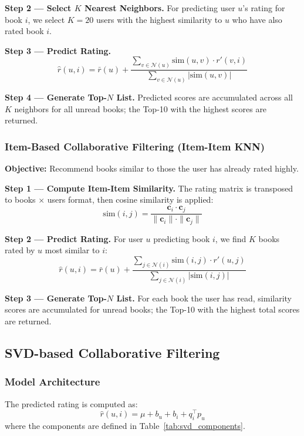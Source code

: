 \documentclass[12pt, a4paper]{article}
\begin{document}
\textbf{Step 2 --- Select $K$ Nearest Neighbors.}
For predicting user $u$'s rating for book $i$, we select $K = 20$ users
with the highest similarity to $u$ who have also rated book $i$.

\textbf{Step 3 --- Predict Rating.}
\[
  \hat{r}(u, i) = \bar{r}(u) + \frac{\sum_{v \in \mathcal{N}(u)} \text{sim}(u,v) \cdot r'(v,i)}
                                     {\sum_{v \in \mathcal{N}(u)} |\text{sim}(u,v)|}
\]

\textbf{Step 4 --- Generate Top-$N$ List.}
Predicted scores are accumulated across all $K$ neighbors for all unread books;
the Top-10 with the highest scores are returned.

\subsubsection{Item-Based Collaborative Filtering (Item-Item KNN)}

\textbf{Objective:} Recommend books similar to those the user has already rated highly.

\textbf{Step 1 --- Compute Item-Item Similarity.}
The rating matrix is transposed to books $\times$ users format, then cosine similarity is applied:
\[
  \text{sim}(i, j) = \frac{\mathbf{c}_i \cdot \mathbf{c}_j}{\|\mathbf{c}_i\| \cdot \|\mathbf{c}_j\|}
\]

\textbf{Step 2 --- Predict Rating.}
For user $u$ predicting book $i$, we find $K$ books rated by $u$ most similar to $i$:
\[
  \hat{r}(u, i) = \bar{r}(u) + \frac{\sum_{j \in \mathcal{N}(i)} \text{sim}(i,j) \cdot r'(u,j)}
                                     {\sum_{j \in \mathcal{N}(i)} |\text{sim}(i,j)|}
\]

\textbf{Step 3 --- Generate Top-$N$ List.}
For each book the user has read, similarity scores are accumulated for unread books;
the Top-10 with the highest total scores are returned.

\subsection{SVD-based Collaborative Filtering \cite{funk2006, koren2009}}
\label{sec:svd_pytorch}

\subsubsection{Model Architecture}

The predicted rating is computed as:
\[
  \hat{r}(u, i) = \mu + b_u + b_i + {q}_i^\top {p}_u
\]
where the components are defined in Table~\ref{tab:svd_components}.
\end{document}
